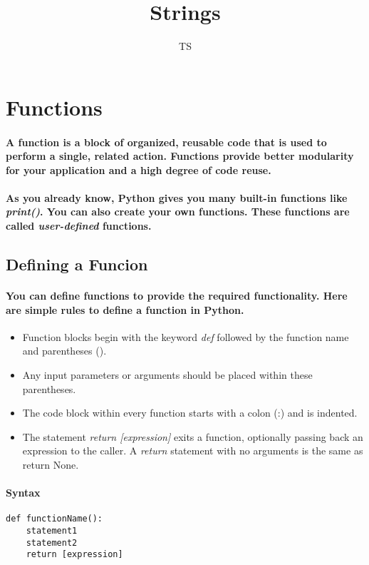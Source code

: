\documentclass{book}
\title{Strings}
\date{}
\author{TS}
\begin{document}
\section*{Functions}

\hrulefill

\paragraph{A function is a block of organized, reusable code that is used to perform a single, related action.
Functions provide better modularity for your application and a high degree of code reuse.}
\paragraph{As you already know, Python gives you many built-in functions like \textit{print()}. You can also
create your own functions. These functions are called \textit{user-defined} functions.}

\subsection*{Defining a Funcion}
\paragraph{You can define functions to provide the required functionality. Here are simple rules to define a
function in Python.}

\begin{itemize}
\item Function blocks begin with the keyword \textit{def} followed by the function name and parentheses ().
\item Any input parameters or arguments should be placed within these parentheses.
\item The code block within every function starts with a colon (:) and is indented.
\item The statement \textit{return [expression]} exits a function, optionally passing back an expression to the
caller. A \textit{return} statement with no arguments is the same as return None.
\end{itemize}
\paragraph{Syntax}
\begin{verbatim}
def functionName():
    statement1
    statement2
    return [expression]
\end{verbatim}
\end{document}
